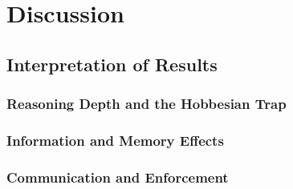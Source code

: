 \chapter{Discussion} %
\label{Discussion}


\section{Interpretation of Results}

\subsection{Reasoning Depth and the Hobbesian Trap}

\subsection{Information and Memory Effects}

\subsection{Communication and Enforcement}

